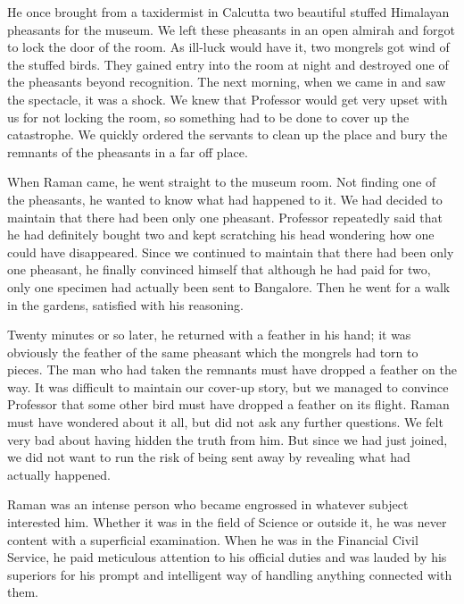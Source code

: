 He once brought from a taxidermist in Calcutta two beautiful stuffed Himalayan pheasants for the museum. We left these pheasants in an open almirah and forgot to lock the door of the room. As ill-luck would have it, two mongrels got wind of the
stuffed birds. They gained entry into the room at night and destroyed one of the pheasants beyond recognition. The next morning, when we came in and saw the spectacle, it was a shock. We knew that Professor would get very upset with us for not locking the room, so something had to be done to cover up the catastrophe. We quickly ordered the servants to clean up the place and bury the remnants of the pheasants in a far off place.

When Raman came, he went straight to the museum room. Not finding one of the pheasants, he wanted to know what had happened to it. We had decided to maintain that there had been only one pheasant. Professor repeatedly said that he had definitely bought two and kept scratching his head wondering how one could have disappeared. Since we continued to maintain that there had been only one pheasant, he finally convinced himself that although he had paid for two, only one specimen had actually been sent to Bangalore. Then he went for a walk in the gardens, satisfied with his reasoning.

Twenty minutes or so later, he returned with a feather in his hand; it was obviously the feather of the same pheasant which the mongrels had torn to pieces. The man who had taken the remnants must have dropped a feather on the way. It was difficult to maintain our cover-up story, but we managed to convince Professor that some other bird must have dropped a feather on its flight. Raman must have wondered about it all, but did not ask any further questions. We felt very bad about having hidden the truth from him. But since we had just joined, we did not want to run the risk of being sent away by revealing what had actually happened.

\medskip
{}
\smallskip



\noindent
Raman was an intense person who became engrossed in whatever subject interested him. Whether it was in the field of Science or outside it, he was never content with a superficial examination. When he was in the Financial Civil Service, he paid meticulous attention to his official duties and was lauded by his superiors for his prompt and intelligent way of handling anything connected with them.

